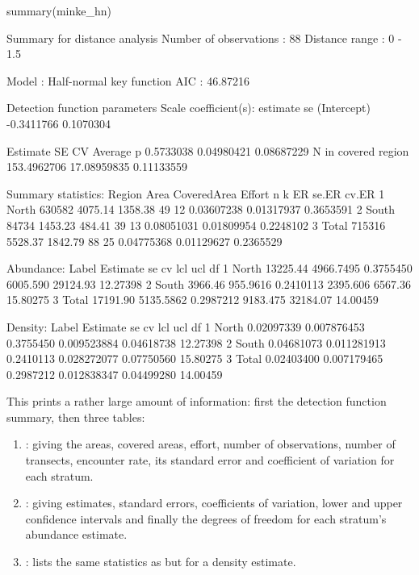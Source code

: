 \documentclass[article]{jss}
\providecommand{\tightlist}{%
  \setlength{\itemsep}{0pt}\setlength{\parskip}{0pt}}
\begin{document}
\begin{CodeChunk}
\begin{CodeInput}
summary(minke_hn)
\end{CodeInput}
\begin{CodeOutput}

Summary for distance analysis 
Number of observations :  88 
Distance range         :  0  -  1.5 

Model : Half-normal key function 
AIC   : 46.87216 

Detection function parameters
Scale coefficient(s):  
              estimate        se
(Intercept) -0.3411766 0.1070304

                       Estimate          SE         CV
Average p             0.5733038  0.04980421 0.08687229
N in covered region 153.4962706 17.08959835 0.11133559

Summary statistics:
  Region   Area CoveredArea  Effort  n  k         ER      se.ER     cv.ER
1  North 630582     4075.14 1358.38 49 12 0.03607238 0.01317937 0.3653591
2  South  84734     1453.23  484.41 39 13 0.08051031 0.01809954 0.2248102
3  Total 715316     5528.37 1842.79 88 25 0.04775368 0.01129627 0.2365529

Abundance:
  Label Estimate        se        cv      lcl      ucl       df
1 North 13225.44 4966.7495 0.3755450 6005.590 29124.93 12.27398
2 South  3966.46  955.9616 0.2410113 2395.606  6567.36 15.80275
3 Total 17191.90 5135.5862 0.2987212 9183.475 32184.07 14.00459

Density:
  Label   Estimate          se        cv         lcl        ucl       df
1 North 0.02097339 0.007876453 0.3755450 0.009523884 0.04618738 12.27398
2 South 0.04681073 0.011281913 0.2410113 0.028272077 0.07750560 15.80275
3 Total 0.02403400 0.007179465 0.2987212 0.012838347 0.04499280 14.00459
\end{CodeOutput}
\end{CodeChunk}

This prints a rather large amount of information: first the detection
function summary, then three tables:

\begin{enumerate}
\def\labelenumi{\arabic{enumi}.}
\tightlist
\item
  : giving the areas, covered areas, effort,
  number of observations, number of transects, encounter rate, its
  standard error and coefficient of variation for each stratum.
\item
  : giving estimates, standard errors, coefficients of
  variation, lower and upper confidence intervals and finally the
  degrees of freedom for each stratum's abundance estimate.
\item
  : lists the same statistics as  but for
  a density estimate.
\end{enumerate}
\end{document}
